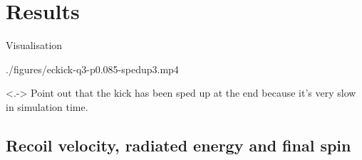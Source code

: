 \documentclass[smaller,aspectratio=169]{beamer}
\begin{document}
\section{Results}

{
\begin{frame}{Visualisation}
	\begin{center}
        {./figures/eckick-q3-p0.085-spedup3.mp4}
    \end{center}
    \note[item]<.->{
        Point out that the kick has been sped up at the end because it's very
        slow in simulation time.}
\end{frame}
}

\subsection{Recoil velocity, radiated energy and final spin}
\end{document}

